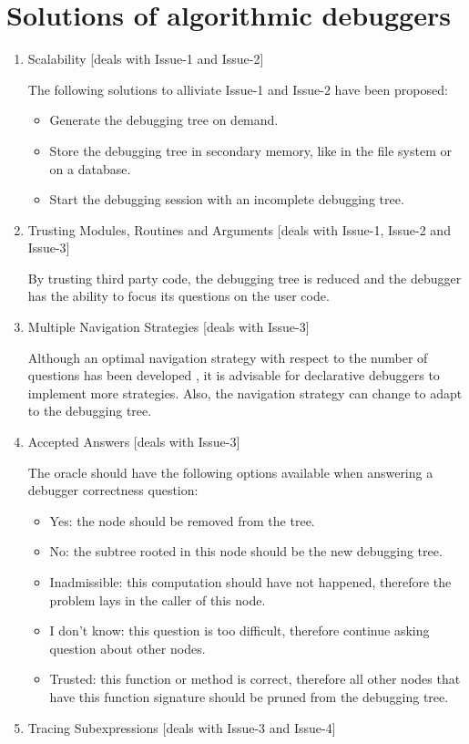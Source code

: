 \section{Solutions of algorithmic debuggers}
\begin{enumerate}
    \item Scalability [deals with Issue-1 and Issue-2]
    
The following solutions to alliviate Issue-1 and Issue-2 have been proposed:
\begin{itemize}
    \item Generate the debugging tree on demand.
    \item Store the debugging tree in secondary memory, like in the file system or on a database.
    \item Start the debugging session with an incomplete debugging tree.
\end{itemize}
    \item Trusting Modules, Routines and Arguments [deals with Issue-1, Issue-2 and Issue-3]
    
By trusting third party code, the debugging tree is reduced and the debugger has the ability to focus its questions on the user code.
    \item Multiple Navigation Strategies [deals with Issue-3]
    
Although an optimal navigation strategy with respect to the number of questions has been developed \cite{optimal_strategy}, it is advisable for declarative debuggers to implement more strategies.
Also, the navigation strategy can change to adapt to the debugging tree.

\item Accepted Answers [deals with Issue-3]

The oracle should have the following options available when answering a debugger correctness question:
\begin{itemize}
    \item Yes: the node should be removed from the tree.
    \item No: the subtree rooted in this node should be the new debugging tree.
    \item Inadmissible: this computation should have not happened, therefore the problem lays in the caller of this node.
    \item I don't know: this question is too difficult, therefore continue asking question about other nodes.
    \item Trusted: this function or method is correct, therefore all other nodes that have this function signature should be pruned from the debugging tree.
\end{itemize}
\item Tracing Subexpressions [deals with Issue-3 and Issue-4]


\end{enumerate}

